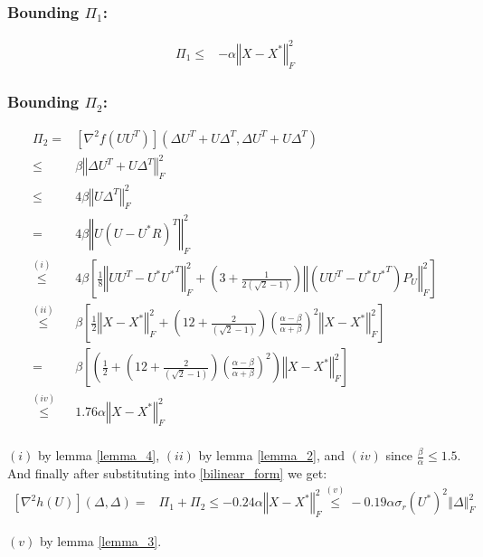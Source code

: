 \documentclass{article}
\begin{document}
\subsubsection{Bounding $\Pi_1$:}
\begin{align*}
    \Pi_1 \le & -\alpha\left\Vert X-X^*\right\Vert^2_F 
\end{align*}

\subsubsection{Bounding $\Pi_2$:}
\begin{align*}
    \Pi_2 = & \left[\nabla^2 f\left(UU^T\right)\right]\left(\Delta U^T+U\Delta^T,\Delta U^T+U\Delta^T\right) \\
    \le & \beta\left\Vert \Delta U^T+U\Delta^T\right\Vert^2_F \\
    \le & 4\beta\left\Vert U \Delta^T \right\Vert^2_F\\
    = & 4\beta\left\Vert U\left(U-U^*R\right)^T\right\Vert^2_F \\
    \overset{\left(i\right)}{\le} & 4\beta\left[\frac{1}{8}\left\Vert UU^T-U^*{U^*}^T\right\Vert^2_F + \left(3 + \frac{1}{2\left(\sqrt{2}- 1\right)}\right)\left\Vert \left(UU^T-U^*{U^*}^T\right)P_U\right\Vert^2_F\right]\\
    \overset{\left(ii\right)}{\le} & \beta\left[\frac{1}{2}\left\Vert X-X^*\right\Vert^2_F + \left(12 + \frac{2}{\left(\sqrt{2}- 1\right)}\right)\left(\frac{\alpha - \beta}{\alpha + \beta}\right)^2\left\Vert X-X^*\right\Vert_F^2\right]\\
    = & \beta\left[\left(\frac{1}{2} + \left(12 + \frac{2}{\left(\sqrt{2}- 1\right)}\right)\left(\frac{\alpha - \beta}{\alpha + \beta}\right)^2\right)\left\Vert X-X^*\right\Vert_F^2\right]\\
    \overset{\left(iv\right)}{\le} & 1.76\alpha\left\Vert X-X^*\right\Vert_F^2 \\
\end{align*}

$\left(i\right)$ by lemma \ref{lemma_4}, $\left(ii\right)$ by lemma \ref{lemma_2}, and $\left(iv\right)$ since $\frac{\beta}{\alpha}\le1.5$. \\

And finally after substituting into \ref{bilinear_form} we get:
\begin{align*}
    \left[\nabla^2h\left(U\right)\right]\left(\Delta,\Delta\right)= & \Pi_1 + \Pi_2 \le -0.24\alpha\left\Vert X-X^*\right\Vert^2_F \overset{\left(v\right)}{\le}  -0.19\alpha\sigma_r\left(U^*\right)^2\left\Vert\Delta\right\Vert^2_F
\end{align*}

$\left(v\right)$ by lemma \ref{lemma_3}.
\end{document}
